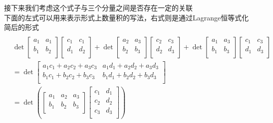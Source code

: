 \documentclass{article}
\begin{document}
\begin{CJK}{UTF8}{gkai}
接下来我们考虑这个式子与三个分量之间是否存在一定的关联\\
下面的左式可以用来表示形式上数量积的写法，右式则是通过Lagrange恒等式化简后的形式\\
\[
\begin{aligned}    
&\quad\\
&\det\begin{bmatrix}
    a_1&a_1\\
    b_1&b_2\\
\end{bmatrix}
\begin{bmatrix}
    c_1&c_1\\
    d_1&d_2\\
\end{bmatrix}
+\det
\begin{bmatrix}
    a_2&a_3\\
    b_2&b_3\\
\end{bmatrix}
\begin{bmatrix}
    c_2&c_3\\
    d_2&d_3\\
\end{bmatrix}
+\det\begin{bmatrix}
    a_1&a_3\\
    b_1&b_3\\
\end{bmatrix}
\begin{bmatrix}
    c_1&c_3\\
    d_1&d_3\\
\end{bmatrix}\\
&=\det
\begin{bmatrix}
    a_1c_1+a_2c_2+a_3c_3&a_1d_1+a_2d_2+a_3d_3\\
    b_1c_1+b_2c_2+b_3c_3&b_1d_1+b_2d_2+b_3d_3\\
\end{bmatrix}\\
&=\det\left(
    \begin{bmatrix}
        a_1&a_2&a_3\\
        b_1&b_2&b_3\\
    \end{bmatrix}
    \begin{bmatrix}
        c_1&d_1\\
        c_2&d_2\\
        c_3&d_3\\
    \end{bmatrix}
\right)
\end{aligned}\]


\end{CJK}
\end{document}

